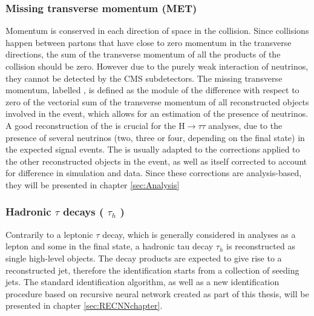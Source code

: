 \subsubsection{Missing transverse momentum (MET)}
Momentum is conserved in each direction of space in the collision. Since collisions happen between partons that have close to zero momentum in the transverse directions, the sum of the transverse momentum of all the products of the collision should be zero. However due to the purely weak interaction of neutrinos, they cannot be detected by the CMS subdetectors. The missing transverse momentum, labelled \ETm, is defined as the module of the difference with respect to zero of the vectorial sum of the transverse momentum of all reconstructed objects involved in the event, which allows for an estimation of the presence of neutrinos. A good reconstruction of the \ETm is crucial for the H$\rightarrow\tau\tau$ analyses, due to the presence of several neutrinos (two, three or four, depending on the final state) in the expected signal events. The \ETm is usually adapted to the corrections applied to the other reconstructed objects in the event, as well as itself corrected to account for difference in simulation and data. Since these corrections are analysis-based, they will be presented in chapter \ref{sec:Analysis}

\subsubsection{Hadronic $\tau$ decays ( $\tau_{h}$ )}
Contrarily to a leptonic $\tau$ decay, which is generally considered in analyses as a lepton and some \ETm in the final state, a hadronic tau decay $\tau_{h}$ is reconstructed as single high-level objects. The \tauh decay products are expected to give rise to a reconstructed jet, therefore the \tauh identification starts from a collection of seeding jets. The standard \tauh identification algorithm, as well as a new identification procedure based on recursive neural network created as part of this thesis, will be presented in chapter \ref{sec:RECNNchapter}.